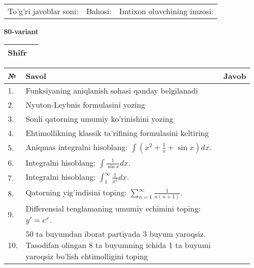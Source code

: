 \documentclass{article}
\begin{document}
  \vspace{1cm}
  
  \begin{tabular}{lll}
  To'g'ri javoblar soni: \underline{\hspace{1.5cm}} & 
  Bahosi: \underline{\hspace{1.5cm}} & 
  Imtixon oluvchining imzosi: \underline{\hspace{2cm}} \\
  \end{tabular}
  
  \egroup
  
  \newpage
  
  
  \textbf{80-variant}\\
  
  \bgroup
  \def\arraystretch{1.6} %
  
  \begin{tabular}{|m{5.7cm}|m{9.5cm}|}
  \hline
  Shifr & \\
  \hline
  \end{tabular}
  
  \vspace{1cm}
  
  \begin{tabular}{|m{0.7cm}|m{10cm}|m{4cm}|}
  \hline
  № & Savol & Javob \\
  \hline
  1. & Funksiyaning aniqlanish sohasi qanday belgilanadi &  \\
  \hline
  2. & Nyuton-Leybnis formulasini yozing &  \\
  \hline
  3. & Sonli qatorning umumiy ko'rinishini yozing &  \\
  \hline
  4. & Ehtimollikning klassik ta'rifining formulasini keltiring &  \\
  \hline
  5. & Aniqmas integralni hisoblang: \(\int {\left( x^{2} + \frac{1}{x} + \sin x \right)dx}\). &  \\
  \hline
  6. & Integralni hisoblang: \(\int {\frac{1}{\sin x}dx}\). &  \\
  \hline
  7. & Integralni hisoblang: \(\int_{1}^{\infty}{\frac{1}{x^{2}}dx}\). &  \\
  \hline
  8. & Qatorning yig'indisini toping: \(\sum_{n = 1}^{\infty}\frac{1}{n(n + 1)}\). &  \\
  \hline
  9. & Differensial tenglamaning umumiy echimini toping: \(y' = e^{x}\). &  \\
  \hline
  10. & 50 ta buyumdan iborat partiyada 3 buyum yaroqsiz. Tasodifan olingan 8 ta buyumning ichida 1 ta buyumi yaroqsiz bo'lish ehtimolligini toping &  \\
  \hline
  \end{tabular}
  
\end{document}
